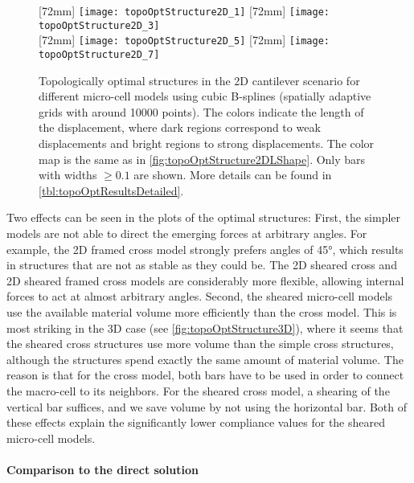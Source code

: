 \begin{figure}
  [72mm]{%
    \texttt{[image: topoOptStructure2D\_1]}%
  }%
  \hfill%
  [72mm]{%
    \texttt{[image: topoOptStructure2D\_3]}%
  }%
  \\[2mm]%
  [72mm]{%
    \texttt{[image: topoOptStructure2D\_5]}%
  }%
  \hfill%
  [72mm]{%
    \texttt{[image: topoOptStructure2D\_7]}%
  }%
  \caption[Optimal structures in the 2D cantilever scenario]{%
    Topologically optimal structures in the 2D cantilever scenario
    for different micro-cell models using cubic B-splines
    (spatially adaptive grids with around \num{10000} points).
    The colors indicate the length of the displacement,
    where dark regions correspond to weak displacements and
    bright regions to strong displacements.
    The color map is the same as in
    \cref{fig:topoOptStructure2DLShape}.
    Only bars with widths $\ge 0.1$ are shown.
    More details can be found in \cref{tbl:topoOptResultsDetailed}.%
  }%
  \label{fig:topoOptStructure2DCantilever}%
\end{figure}

Two effects can be seen in the plots of the optimal structures:
First, the simpler models are not able to direct the emerging forces at
arbitrary angles.
For example, the 2D framed cross model strongly prefers
angles of \ang{45}, which results in structures that are not as stable
as they could be.
The 2D sheared cross and 2D sheared framed cross models
are considerably more flexible, allowing
internal forces to act at almost arbitrary angles.
Second, the sheared micro-cell models use the available
material volume more efficiently than the cross model.
This is most striking in the 3D case (see \cref{fig:topoOptStructure3D}),
where it seems that the sheared cross structures
use more volume than the simple cross structures,
although the structures spend exactly the same amount of material volume.
The reason is that for the cross model, both bars
have to be used in order to connect the macro-cell to its neighbors.
For the sheared cross model, a shearing of the vertical bar suffices,
and we save volume by not using the horizontal bar.
Both of these effects explain the significantly lower compliance
values for the sheared micro-cell models.

\paragraph{Comparison to the direct solution}

